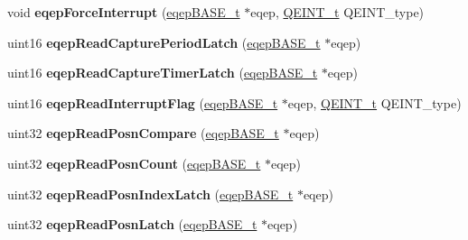 \begin{DoxyCompactItemize}
void {\bfseries eqep\+Force\+Interrupt} (\mbox{\hyperlink{reg__eqep_8h_a794db63555812863c39c5d214fd4f215}{eqep\+B\+A\+S\+E\+\_\+t}} $\ast$eqep, \mbox{\hyperlink{eqep_8h_af85f2f99be537503acd2fddf67e63caf}{Q\+E\+I\+N\+T\+\_\+t}} Q\+E\+I\+N\+T\+\_\+type)
\item 
\mbox{\label{group__eQEP_ga5ab25377cdca77529b3635a0469e0a73}} 
uint16 {\bfseries eqep\+Read\+Capture\+Period\+Latch} (\mbox{\hyperlink{reg__eqep_8h_a794db63555812863c39c5d214fd4f215}{eqep\+B\+A\+S\+E\+\_\+t}} $\ast$eqep)
\item 
\mbox{\label{group__eQEP_ga99ff87bfecf3ce73f2793095f78c476c}} 
uint16 {\bfseries eqep\+Read\+Capture\+Timer\+Latch} (\mbox{\hyperlink{reg__eqep_8h_a794db63555812863c39c5d214fd4f215}{eqep\+B\+A\+S\+E\+\_\+t}} $\ast$eqep)
\item 
\mbox{\label{group__eQEP_ga2f86ce8c9bf614bb488bffc0936a5e2f}} 
uint16 {\bfseries eqep\+Read\+Interrupt\+Flag} (\mbox{\hyperlink{reg__eqep_8h_a794db63555812863c39c5d214fd4f215}{eqep\+B\+A\+S\+E\+\_\+t}} $\ast$eqep, \mbox{\hyperlink{eqep_8h_af85f2f99be537503acd2fddf67e63caf}{Q\+E\+I\+N\+T\+\_\+t}} Q\+E\+I\+N\+T\+\_\+type)
\item 
\mbox{\label{group__eQEP_gad40979a1412f1f46e57f9b0b00fe3994}} 
uint32 {\bfseries eqep\+Read\+Posn\+Compare} (\mbox{\hyperlink{reg__eqep_8h_a794db63555812863c39c5d214fd4f215}{eqep\+B\+A\+S\+E\+\_\+t}} $\ast$eqep)
\item 
\mbox{\label{group__eQEP_gacd1de7edcff1ac979cca508f08c1fd2d}} 
uint32 {\bfseries eqep\+Read\+Posn\+Count} (\mbox{\hyperlink{reg__eqep_8h_a794db63555812863c39c5d214fd4f215}{eqep\+B\+A\+S\+E\+\_\+t}} $\ast$eqep)
\item 
\mbox{\label{group__eQEP_ga003d83810688f636685188642390befe}} 
uint32 {\bfseries eqep\+Read\+Posn\+Index\+Latch} (\mbox{\hyperlink{reg__eqep_8h_a794db63555812863c39c5d214fd4f215}{eqep\+B\+A\+S\+E\+\_\+t}} $\ast$eqep)
\item 
\mbox{\label{group__eQEP_ga50a000d7045103788454de64ceeda80c}} 
uint32 {\bfseries eqep\+Read\+Posn\+Latch} (\mbox{\hyperlink{reg__eqep_8h_a794db63555812863c39c5d214fd4f215}{eqep\+B\+A\+S\+E\+\_\+t}} $\ast$eqep)

\end{DoxyCompactItemize}
